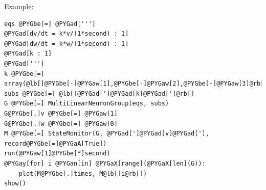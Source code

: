\documentclass[letterpaper,10pt,english]{manual}
\begin{document}
Example:

\begin{Verbatim}[commandchars=@\[\]]
eqs @PYGbe[=] @PYGad[''']
@PYGad[dv/dt = k*v/(1*second) : 1]
@PYGad[dw/dt = k*w/(1*second) : 1]
@PYGad[k : 1]
@PYGad[''']
k @PYGbe[=] array(@lb[]@PYGbe[-]@PYGaw[1],@PYGbe[-]@PYGaw[2],@PYGbe[-]@PYGaw[3]@rb[])
subs @PYGbe[=] @lb[]@PYGad[']@PYGad[k]@PYGad[']@rb[]
G @PYGbe[=] MultiLinearNeuronGroup(eqs, subs)
G@PYGbe[.]v @PYGbe[=] @PYGaw[1]
G@PYGbe[.]w @PYGbe[=] @PYGaw[0]
M @PYGbe[=] StateMonitor(G, @PYGad[']@PYGad[v]@PYGad['], record@PYGbe[=]@PYGaA[True])
run(@PYGaw[1]@PYGbe[*]second)
@PYGay[for] i @PYGan[in] @PYGaX[range](@PYGaX[len](G)):
    plot(M@PYGbe[.]times, M@lb[]i@rb[])
show()
\end{Verbatim}


\renewcommand{\indexname}{Module Index}
\printmodindex
\renewcommand{\indexname}{Index}
\printindex
\end{document}
